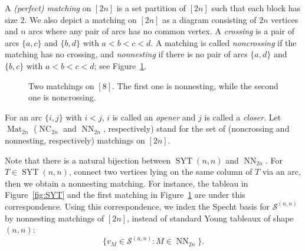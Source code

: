 \documentclass[reqno,12pt]{amsart}
\theoremstyle{definition}
\theoremstyle{remark}
\newcommand\Spec{\mathcal{S}}
\newcommand\SYT{\operatorname{SYT}}
\newcommand\NC{\operatorname{NC}}
\newcommand\NN{\operatorname{NN}}
\newcommand\Mat{\operatorname{Mat}}
\newcommand\Matching[2]{\draw (#1,0) to [out=55,in=125] (#2,0);}
\begin{document}
A \emph{(perfect) matching} on \( [2n] \) is a set partition of \( [2n] \) such that
each block has size 2.
We also depict a matching on \( [2n] \) as a diagram consisting of \( 2n \)
vertices and \( n \) arcs where any pair of arcs has no common vertex.
A \emph{crossing} is a pair of arcs \( \{a,c\} \) and \( \{b,d\} \)
with \( a<b<c<d \).
A matching is called \emph{noncrossing} if the matching has no crossing,
and \emph{nonnesting} if there is no pair of arcs \( \{a,d\} \)
and \( \{b,c\} \) with \( a<b<c<d \); see Figure~\ref{fig:matching}.
\begin{figure}
   \qquad
  \caption{Two matchings on \( [8] \). The first one is nonnesting, while the second one is noncrossing.}
  \label{fig:matching}
\end{figure}
For an arc \( \{i,j\} \) with \( i<j \), $i$ is called an
\emph{opener} and $j$ is called a \emph{closer}. 
Let \( \Mat_{2n} \) (\( \NC_{2n} \) and \( \NN_{2n} \), respectively) stand for
the set of (noncrossing and nonnesting, respectively) matchings on \( [2n] \).

Note that there is a natural bijection between \( \SYT(n,n) \) and
\( \NN_{2n} \). For \( T\in\SYT(n,n) \), connect two vertices lying
on the same column of \( T \) via an arc, then we obtain a
nonnesting matching. For instance, the tableau in Figure~\ref{fig:SYT}
and the first matching in Figure~\ref{fig:matching} are under this correspondence.
Using this correspondence, we index the Specht basis for \( \Spec^{(n,n)} \)
by nonnesting matchings of \( [2n] \), instead of standard Young tableaux of shape
\( (n,n) \):
\[
  \{ v_M \in \Spec^{(n,n)} : M\in\NN_{2n} \}.
\]
\end{document}
